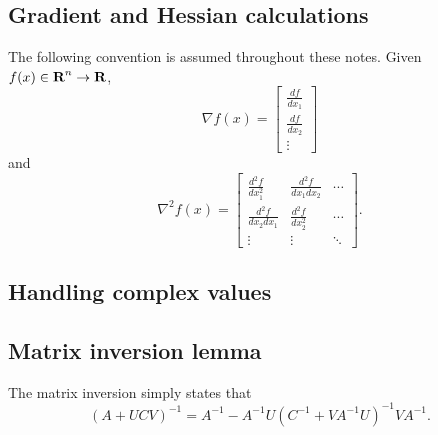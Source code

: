 \documentclass{article}
\begin{document}
\begin{appendix}
\subsection{Gradient and Hessian calculations}
The following convention is assumed throughout these notes.
Given $f(x) \in {\mbox{\bf R}}^n \to {\mbox{\bf R}}$,
    \begin{equation}
    \nabla f(x) = \begin{bmatrix}
        \frac{df}{dx_1} \\
        \frac{df}{dx_2} \\
        \vdots
        \end{bmatrix}
    \end{equation}
    and
    \begin{equation}
    \nabla^2 f(x) = \begin{bmatrix}
        \frac{d^2f}{dx_1^2} & \frac{d^2f}{dx_1 dx_2} & \cdots \\
        \frac{d^2f}{dx_2 dx_1} & \frac{d^2f}{dx_2^2} & \cdots \\
        \vdots & \vdots & \ddots
        \end{bmatrix}.
    \end{equation}

\subsection{Handling complex values}

\subsection{Matrix inversion lemma}\label{inv lemma}
The matrix inversion simply states that
\begin{equation}
(A + UCV)^{-1} = A^{-1} - A^{-1}U (C^{-1} + V A^{-1} U)^{-1} V A^{-1}.
\end{equation}


\end{appendix}
\end{document}
